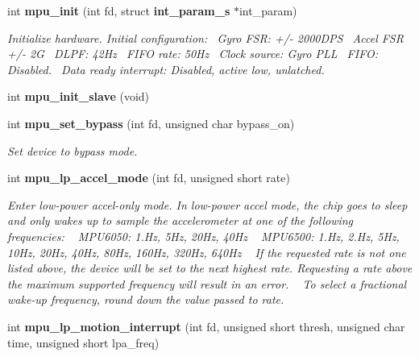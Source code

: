 \begin{DoxyCompactItemize}
\item 
int \textbf{ mpu\+\_\+init} (int fd, struct \textbf{ int\+\_\+param\+\_\+s} $\ast$int\+\_\+param)
\begin{DoxyCompactList}\small\item\em Initialize hardware. Initial configuration\+:~\newline
Gyro F\+SR\+: +/-\/ 2000\+D\+PS~\newline
Accel F\+SR +/-\/ 2G~\newline
D\+L\+PF\+: 42\+Hz~\newline
F\+I\+FO rate\+: 50\+Hz~\newline
Clock source\+: Gyro P\+LL~\newline
F\+I\+FO\+: Disabled.~\newline
Data ready interrupt\+: Disabled, active low, unlatched. \end{DoxyCompactList}\item 
int \textbf{ mpu\+\_\+init\+\_\+slave} (void)
\item 
int \textbf{ mpu\+\_\+set\+\_\+bypass} (int fd, unsigned char bypass\+\_\+on)
\begin{DoxyCompactList}\small\item\em Set device to bypass mode. \end{DoxyCompactList}\item 
int \textbf{ mpu\+\_\+lp\+\_\+accel\+\_\+mode} (int fd, unsigned short rate)
\begin{DoxyCompactList}\small\item\em Enter low-\/power accel-\/only mode. In low-\/power accel mode, the chip goes to sleep and only wakes up to sample the accelerometer at one of the following frequencies\+: ~\newline
 M\+P\+U6050\+: 1.\+Hz, 5\+Hz, 20\+Hz, 40\+Hz ~\newline
 M\+P\+U6500\+: 1.\+Hz, 2.\+Hz, 5\+Hz, 10\+Hz, 20\+Hz, 40\+Hz, 80\+Hz, 160\+Hz, 320\+Hz, 640\+Hz ~\newline
 If the requested rate is not one listed above, the device will be set to the next highest rate. Requesting a rate above the maximum supported frequency will result in an error. ~\newline
 To select a fractional wake-\/up frequency, round down the value passed to {\itshape rate}. \end{DoxyCompactList}\item 
int \textbf{ mpu\+\_\+lp\+\_\+motion\+\_\+interrupt} (int fd, unsigned short thresh, unsigned char time, unsigned short lpa\+\_\+freq)

\end{DoxyCompactItemize}
